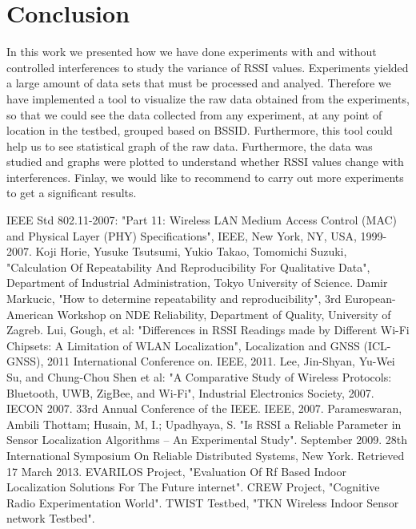 \documentclass[11pt,a4paper,headinclude,footinclude,chapterprefix=on]{scrreprt}
\begin{document}
\begin{longtable}
\end{longtable}

\chapter{Conclusion}
In this work we presented how we have done experiments with and without controlled interferences to study the variance of RSSI values. Experiments yielded a large amount of data sets that must be processed and analyed. Therefore we have implemented a tool to visualize the raw data obtained from the experiments, so that we could see the data collected from any experiment, at any point of location in the testbed, grouped based on BSSID. Furthermore, this tool could help us to see statistical graph of the raw data. Furthermore, the data was studied and graphs were plotted to understand whether RSSI values change with interferences. Finlay, we would like to recommend to carry out more experiments to get a significant results. 

\begin{thebibliography}{1}
 IEEE Std 802.11-2007: "Part 11: Wireless LAN Medium Access Control (MAC) and Physical Layer (PHY) Specifications", IEEE, New York, NY, USA, 1999-2007.
 Koji Horie, Yusuke Tsutsumi, Yukio Takao, Tomomichi Suzuki, "Calculation Of Repeatability And Reproducibility For Qualitative Data", Department of Industrial Administration, Tokyo University of Science.
 Damir Markucic, "How to determine repeatability and reproducibility", 3rd European-American Workshop on NDE Reliability, Department of Quality, University of Zagreb.
 Lui, Gough, et al: "Differences in RSSI Readings made by Different Wi-Fi Chipsets: A Limitation of WLAN Localization", Localization and GNSS (ICL-GNSS), 2011 International Conference on. IEEE, 2011.
 Lee, Jin-Shyan, Yu-Wei Su, and Chung-Chou Shen et al: "A Comparative Study of Wireless Protocols: Bluetooth, UWB, ZigBee, and Wi-Fi", Industrial Electronics Society, 2007. IECON 2007. 33rd Annual Conference of the IEEE. IEEE, 2007.
 Parameswaran, Ambili Thottam; Husain, M, I.; Upadhyaya, S. "Is RSSI a Reliable Parameter in Sensor Localization Algorithms – An Experimental Study". September 2009. 28th International Symposium On Reliable Distributed Systems, New York. Retrieved 17 March 2013.
 EVARILOS Project, "Evaluation Of Rf Based Indoor Localization Solutions For The Future internet". 
 CREW Project, "Cognitive Radio Experimentation World".
 TWIST Testbed, "TKN Wireless Indoor Sensor network Testbed".
\end{thebibliography}
\end{document}

